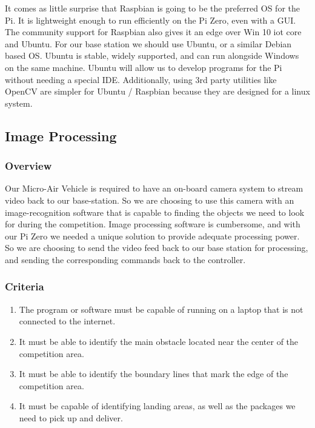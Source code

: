 \documentclass[onecolumn, draftclsnofoot,10pt, compsoc]{IEEEtran}
\begin{document}
It comes as little surprise that Raspbian is going to be the 
preferred OS for the Pi. It is lightweight enough to run 
efficiently on the Pi Zero, even with a GUI. The community support 
for Raspbian also gives it an edge over Win 10 iot core and Ubuntu. 
For our base station we should use Ubuntu, or a similar Debian 
based OS. Ubuntu is stable, widely supported, and can run alongside 
Windows on the same machine. Ubuntu will allow us to develop 
programs for the Pi without needing a special IDE. Additionally, 
using 3rd party utilities like OpenCV are simpler for Ubuntu / 
Raspbian because they are designed for a linux system.  





\subsection{Image Processing}

\subsubsection{Overview}

Our Micro-Air Vehicle is required to have an on-board camera system 
to stream video back to our base-station. So we are choosing to use 
this camera with an image-recognition software that is capable to 
finding the objects we need to look for during the competition. 
Image processing software is cumbersome, and with our Pi Zero we 
needed a unique solution to provide adequate processing power. So 
we are choosing to send the video feed back to our base station for 
processing, and sending the corresponding commands back to the 
controller. 

\subsubsection{Criteria}

\begin{enumerate}
\item{The program or software must be capable of running on a 
laptop that is not connected to the internet.}

\item{It must be able to identify the main obstacle located near 
the center of the competition area.}

\item{It must be able to identify the boundary lines that mark the 
edge of the competition area.}

\item{It must be capable of identifying landing areas, as well as 
the packages we need to pick up and deliver. }
\end{enumerate}
\end{document}

